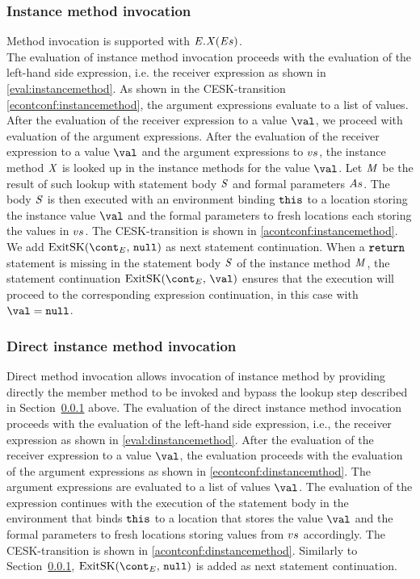 \documentclass{article}
\begin{document}
\subsubsection{Instance method invocation}
\label{subsubsec:instance-method-invoc}
Method invocation is supported with $\mathit{E}.\mathit{X}(\mathit{E}{s})$.\\
The evaluation of instance method invocation proceeds with the evaluation of the left-hand side expression, i.e. the receiver expression as shown in \eqref{eval:instancemethod}.
As shown in the CESK-transition \eqref{econtconf:instancemethod}, the argument expressions evaluate to a list of values.\\
After the evaluation of the receiver expression to a value $\val$, we proceed with evaluation of the argument expressions.
After the evaluation of the receiver expression to a value $\val$ and the argument expressions to $vs$, the instance method $\mathit{X}$ is looked up in the instance methods for the value $\val$.
Let $\mathit{M}$ be the result of such lookup with statement body $\mathit{S}$ and formal parameters $As$.
The body $\mathit{S}$ is then executed with an environment binding $\tt{this}$ to a location storing the instance value $\val$ and the formal parameters to fresh locations each storing the values in $vs$.
The CESK-transition is shown in \eqref{acontconf:instancemethod}.
We add $\ExitSK{\tt{null}}$ as next statement continuation.
When a $\tt{return}$ statement is missing in the statement body $\mathit{S}$ of the instance method $\mathit{M}$, the statement continuation $\ExitSK{\val}$ ensures that the execution will proceed to the corresponding expression continuation, in this case with $\val = \tt{null}$.

\subsubsection{Direct instance method invocation}
\label{subsubsec:direct-instance-method-invoc}
Direct method invocation allows invocation of instance method by providing directly the member method to be invoked and bypass the lookup step described in Section~\ref{subsubsec:instance-method-invoc} above.
The evaluation of the direct instance method invocation proceeds with the evaluation of the left-hand side expression, i.e., the receiver expression as shown in \eqref{eval:dinstancemethod}.
After the evaluation of the receiver expression to a value $\val$, the evaluation proceeds with the evaluation of the argument expressions as shown in \eqref{econtconf:dinstancemthod}.
The argument expressions are evaluated to a list of values $\val$.
The evaluation of the expression continues with the execution of the statement body in the environment that binds $\tt{this}$ to a location that stores the value $\val$ and the formal parameters to fresh locations storing values from $vs$ accordingly.
The CESK-transition is shown in \eqref{acontconf:dinstancemethod}.
Similarly to Section~\ref{subsubsec:instance-method-invoc}, $\ExitSK{\tt{null}}$ is added as next statement continuation.
\end{document}
